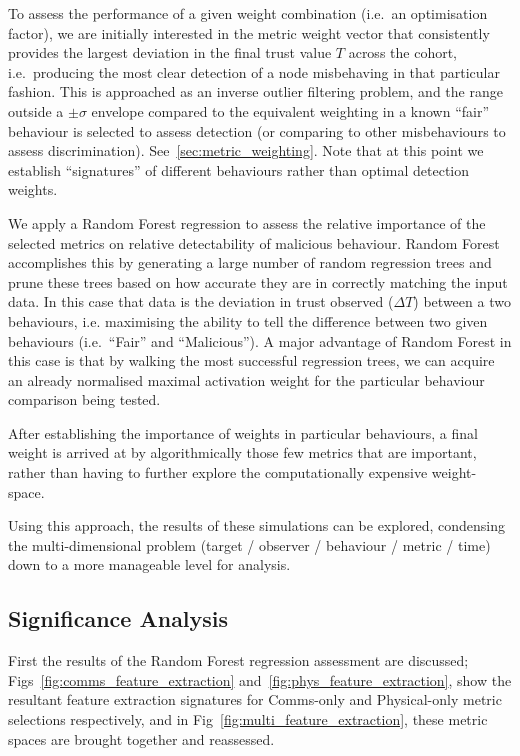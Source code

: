 To assess the performance of a given weight combination (i.e.\ an optimisation factor), we are initially interested in the metric weight vector that consistently provides the largest deviation in the final trust value $T$ across the cohort, i.e.\ producing the most clear detection of a node misbehaving in that particular fashion.
This is approached as an inverse outlier filtering problem, and the range outside a $\pm\sigma$ envelope compared to the equivalent weighting in a known ``fair'' behaviour is selected to assess detection (or comparing to other misbehaviours to assess discrimination).
See~\autoref{sec:metric_weighting}.
Note that at this point we establish ``signatures'' of different behaviours rather than optimal detection weights.

We apply a Random Forest regression \cite{Breiman2001} to assess the relative importance of the selected metrics on relative detectability of malicious behaviour. 
Random Forest accomplishes this by generating a large number of random regression trees and prune these trees based on how accurate they are in correctly matching the input data.
In this case that data is the deviation in trust observed ($\Delta T$) between a two behaviours, i.e. maximising the ability to tell the difference between two given behaviours (i.e.\ ``Fair'' and ``Malicious'').
A major advantage of Random Forest in this case is that by walking the most successful regression trees, we can acquire an already normalised maximal activation weight for the particular behaviour comparison being tested.

After establishing the importance of weights in particular behaviours, a final weight is arrived at by algorithmically those few metrics that are important, rather than having to further explore the computationally expensive weight-space.

Using this approach, the results of these simulations can be explored, condensing the multi-dimensional problem (target / observer / behaviour / metric / time) down to a more manageable level for analysis.

\subsection{Significance Analysis}

First the results of the Random Forest regression assessment are discussed; Figs~\ref{fig:comms_feature_extraction} and~\ref{fig:phys_feature_extraction}, show the resultant feature extraction signatures for Comms-only and Physical-only metric selections respectively, and in Fig~\ref{fig:multi_feature_extraction}, these metric spaces are brought together and reassessed.

